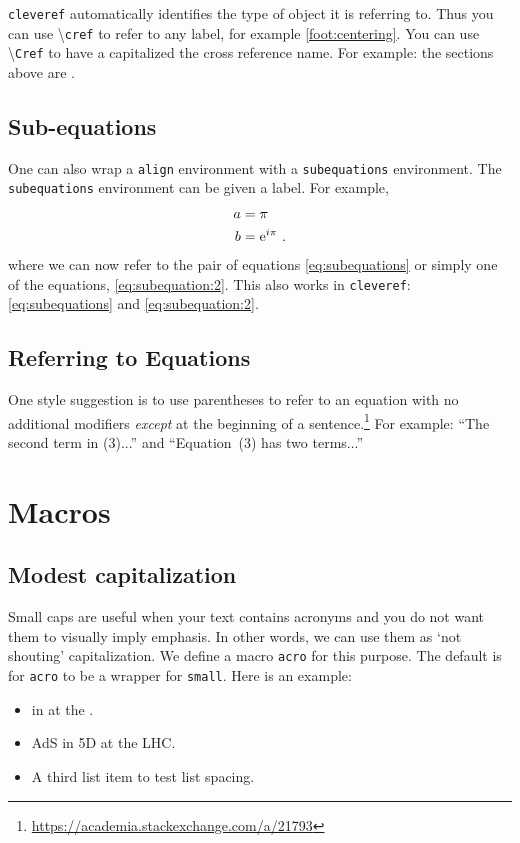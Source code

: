 \texttt{cleveref} automatically identifies the type of object it is referring to. Thus you can use \textbackslash\texttt{cref} to refer to any label, for example \cref{foot:centering}. You can use \textbackslash\texttt{Cref} to have a capitalized the cross reference name. For example: the sections above are .


\subsection{Sub-equations}

One can also wrap a \texttt{align} environment with a \texttt{subequations} environment. The \texttt{subequations} environment can be given a label. For example,
\begin{subequations}\label{eq:subequations}
\begin{align}
	a &= \pi 
	\label{eq:subequation:1}
	\\
	b &= \textnormal{e}^{i\pi} 
	\ .
	\label{eq:subequation:2}
\end{align}
\end{subequations}
where we can now refer to the pair of equations \eqref{eq:subequations} or simply one of the equations, \eqref{eq:subequation:2}. This also works in \texttt{cleveref}: \cref{eq:subequations} and \cref{eq:subequation:2}.


\subsection{Referring to Equations}

One style suggestion is to use parentheses to refer to an equation with no additional modifiers \emph{except} at the beginning of a sentence.\footnote{\url{https://academia.stackexchange.com/a/21793}} For example: ``The second term in (3)...'' and ``Equation~(3) has two terms...''



\section{Macros}
\label{sec:macros}


\subsection{Modest capitalization}

Small caps are useful when your text contains acronyms and you do not want them to visually imply emphasis. In other words, we can use them as `not shouting' capitalization. We define a macro \texttt{acro} for this purpose. The default is for \texttt{acro} to be a wrapper for \texttt{small}. Here is an example:
\begin{itemize}
	\item {} in  at the .
	\item AdS in 5D at the LHC. 
	\item A third list item to test list spacing.
\end{itemize}


